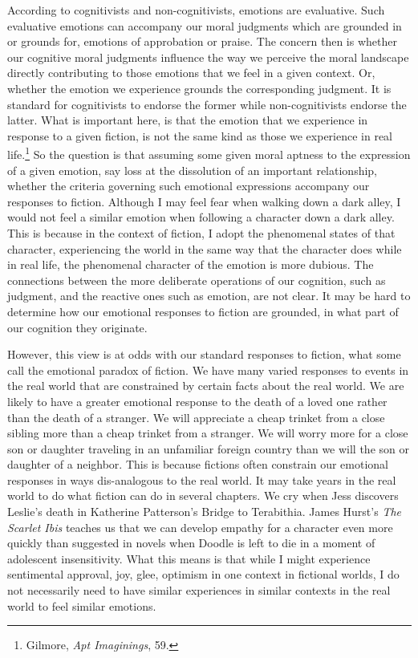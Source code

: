\documentclass[phdthesis,12pt,final]{wuthesis}
\theoremstyle{definition}
\theoremstyle{definition}
\theoremstyle{definition}
\theoremstyle{definition}
\theoremstyle{remark}
\begin{document}
According to cognitivists and non-cognitivists, emotions are evaluative. Such evaluative emotions can accompany our moral judgments which are grounded in or grounds for, emotions of approbation or praise. The concern then is whether our cognitive moral judgments influence the way we perceive the moral landscape directly contributing to those emotions that we feel in a given context. Or, whether the emotion we experience grounds the corresponding judgment. It is standard for cognitivists to endorse the former while non-cognitivists endorse the latter. What is important here, is that the emotion that we experience in response to a given fiction, is not the same kind as those we experience in real life.\footnote{Gilmore, \emph{Apt {Imaginings}}, 59.} So the question is that assuming some given moral aptness to the expression of a given emotion, say loss at the dissolution of an important relationship, whether the criteria governing such emotional expressions accompany our responses to fiction. Although I may feel fear when walking down a dark alley, I would not feel a similar emotion when following a character down a dark alley. This is because in the context of fiction, I adopt the phenomenal states of that character, experiencing the world in the same way that the character does while in real life, the phenomenal character of the emotion is more dubious. The connections between the more deliberate operations of our cognition, such as judgment, and the reactive ones such as emotion, are not clear. It may be hard to determine how our emotional responses to fiction are grounded, in what part of our cognition they originate.

However, this view is at odds with our standard responses to fiction, what some call the emotional paradox of fiction. We have many varied responses to events in the real world that are constrained by certain facts about the real world. We are likely to have a greater emotional response to the death of a loved one rather than the death of a stranger. We will appreciate a cheap trinket from a close sibling more than a cheap trinket from a stranger. We will worry more for a close son or daughter traveling in an unfamiliar foreign country than we will the son or daughter of a neighbor. This is because fictions often constrain our emotional responses in ways dis-analogous to the real world. It may take years in the real world to do what fiction can do in several chapters. We cry when Jess discovers Leslie's death in Katherine Patterson's Bridge to Terabithia. James Hurst's \emph{The Scarlet Ibis} teaches us that we can develop empathy for a character even more quickly than suggested in novels when Doodle is left to die in a moment of adolescent insensitivity. What this means is that while I might experience sentimental approval, joy, glee, optimism in one context in fictional worlds, I do not necessarily need to have similar experiences in similar contexts in the real world to feel similar emotions.
\end{document}

